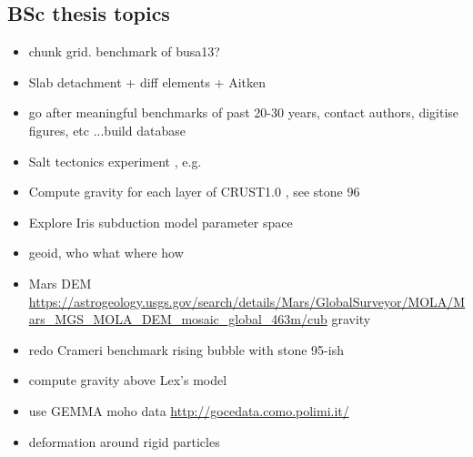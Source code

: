 \subsection{BSc thesis topics}
\begin{itemize} 
\item chunk grid. benchmark of busa13?
\item Slab detachment + diff elements + Aitken
\item go after meaningful benchmarks of past 20-30 years, contact authors, digitise figures, etc ...build database
\item Salt tectonics experiment , e.g. \cite{bers72} 
\item Compute gravity for each layer of CRUST1.0 , see stone 96
\item Explore Iris subduction model parameter space
\item geoid, who what where how
\item Mars DEM \url{https://astrogeology.usgs.gov/search/details/Mars/GlobalSurveyor/MOLA/Mars_MGS_MOLA_DEM_mosaic_global_463m/cub} gravity
\item redo Crameri benchmark rising bubble with stone 95-ish
\item compute gravity above Lex's model \cite{furc15}
\item use GEMMA moho data \url{http://gocedata.como.polimi.it/} \cite{resa15} 
\item deformation around rigid particles \cite{ilma93}
\end{itemize}

